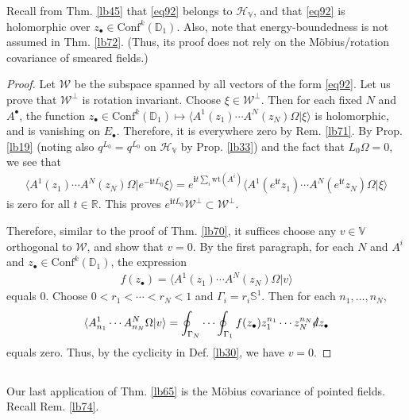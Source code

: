 \documentclass[12pt,b5paper,notitlepage]{article}
\theoremstyle{definition}
\theoremstyle{plain}
\newcommand{\mc}{\mathcal}
\newcommand{\ovl}{\overline}
\newcommand{\Conf}{\mathrm{Conf}}
\newcommand{\bk}[1]{\langle {#1}\rangle}
\newcommand{\im}{\mathbf{i}}
\newcommand{\blt}{\bullet}
\newcommand{\Vbb}{\mathbb V}
\newcommand{\Rbb}{\mathbb R}
\newcommand{\Dbb}{\mathbb D}
\newcommand{\wt}{\mathrm{wt}}
\newcommand{\Sbb}{{\mathbb S}}
\newcommand{\HV}{\mathcal H_{\mathbb V}}
\newcommand{\ointn}{\oint\nolimits}
\newcommand{\sd}{\slashed{d}}
\numberwithin{equation}{section}
\begin{document}
Recall from Thm. \ref{lb45} that \eqref{eq92} belongs to $\HV$, and that \eqref{eq92} is holomorphic over $z_\blt\in\Conf^k(\Dbb_1)$. Also, note that energy-boundedness is not assumed in Thm. \ref{lb72}. (Thus, its proof does not rely on the M\"obius/rotation covariance of smeared fields.)

\begin{proof}
Let $\mc W$ be the subspace spanned by all vectors of the form \eqref{eq92}. Let us prove that $\mc W^\perp$ is rotation invariant. Choose $\xi\in\mc W^\perp$. Then for each fixed $N$ and $A^\blt$, the function $z_\blt\in \Conf^k(\Dbb_1)\mapsto \bk{A^1(z_1)\cdots A^N(z_N)\Omega|\xi}$ is holomorphic, and is vanishing on $E_\blt$. Therefore, it is everywhere zero by Rem. \ref{lb71}. By Prop. \ref{lb19} (noting also $q^{L_0}=q^{\ovl{L_0}}$ on $\HV$ by Prop. \ref{lb33}) and the fact that $L_0\Omega=0$, we see that
\begin{align*}
\bk{A^1(z_1)\cdots A^N(z_N)\Omega|e^{-\im t\ovl{L_0}}\xi}=e^{\im t\sum_i\wt(A^i)}\bk{A^1(e^{\im t}z_1)\cdots A^N(e^{\im t}z_N)\Omega|\xi}
\end{align*}
is zero for all $t\in\Rbb$. This proves $e^{\im t\ovl{L_0}}\mc W^\perp\subset\mc W^\perp$.

Therefore, similar to the proof of Thm. \ref{lb70}, it suffices choose any $v\in\Vbb$ orthogonal to $\mc W$, and show that $v=0$. By the first paragraph, for each $N$ and $A^i$ and $z_\blt\in\Conf^k(\Dbb_1)$, the expression
\begin{align*}
f(z_\blt)=\bk{A^1(z_1)\cdots A^N(z_N)\Omega|v}
\end{align*}
equals $0$. Choose $0<r_1<\cdots<r_N<1$ and $\Gamma_i=r_i\Sbb^1$. Then for each $n_1,\dots,n_N$,
\begin{align*}
\bk{A^1_{n_1}\cdots A^N_{n_N}\Omega|v}=\ointn_{\Gamma_N}\cdots\ointn_{\Gamma_1}f(z_\blt)z_1^{n_1}\cdots z_N^{n_N}\sd z_\blt
\end{align*}
equals zero. Thus, by the cyclicity in Def. \ref{lb30}, we have $v=0$.
\end{proof}


\subsection{}

Our last application of Thm. \ref{lb65} is the M\"obius covariance of pointed fields. Recall Rem. \ref{lb74}. 
\end{document}

